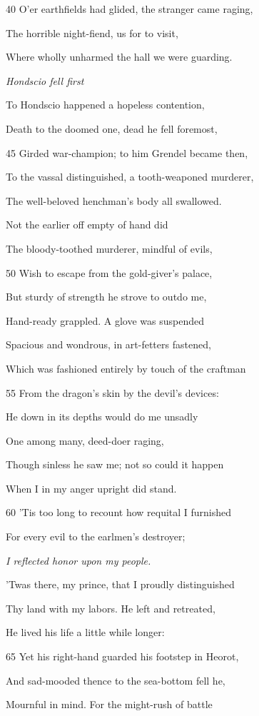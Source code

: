 40
O’er earthfields had glided, the stranger came raging,

The horrible night-fiend, us for to visit,

Where wholly unharmed the hall we were guarding.

\emph{Hondscio fell first}

To Hondscio happened a hopeless contention,

Death to the doomed one, dead he fell foremost,

45
Girded war-champion; to him Grendel became then,

To the vassal distinguished, a tooth-weaponed murderer,

The well-beloved henchman’s body all swallowed.

Not the earlier off empty of hand did

The bloody-toothed murderer, mindful of evils,

50
Wish to escape from the gold-giver’s palace,

But sturdy of strength he strove to outdo me,

Hand-ready grappled. A glove was suspended

Spacious and wondrous, in art-fetters fastened,

Which was fashioned entirely by touch of the craftman

55
From the dragon’s skin by the devil’s devices:

He down in its depths would do me unsadly

One among many, deed-doer raging,

Though sinless he saw me; not so could it happen

When I in my anger upright did stand.

60
’Tis too long to recount how requital I furnished

For every evil to the earlmen’s destroyer;

\emph{I reflected honor
upon my people.}

’Twas there, my prince, that I proudly distinguished

Thy land with my labors. He left and retreated,

He lived his life a little while longer:

65
Yet his right-hand guarded his footstep in Heorot,

And sad-mooded thence to the sea-bottom fell he,

Mournful in mind. For the might-rush of battle


